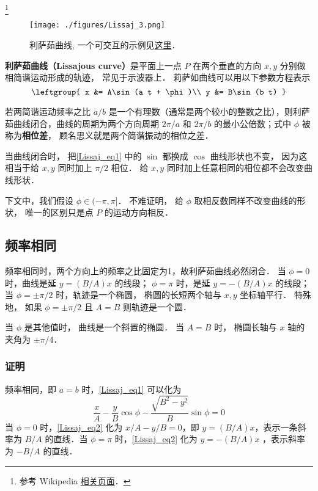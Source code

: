 

\footnote{参考 Wikipedia \href{https://en.wikipedia.org/wiki/Lissajous_curve}{相关页面}．}

\begin{figure}[ht]
\centering
\texttt{[image: ./figures/Lissaj\_3.png]}
\caption{利萨茹曲线, 一个可交互的示例见\href{https://www.geogebra.org/m/ubcdrmjb}{这里}．} \label{Lissaj_fig3}
\end{figure}

\textbf{利萨茹曲线（Lissajous curve）}是平面上一点 $P$ 在两个垂直的方向 $x, y$ 分别做相简谐运动形成的轨迹， 常见于示波器上． 莉萨如曲线可以用以下参数方程表示
\begin{equation}\label{Lissaj_eq1}
\leftgroup{
x &= A\sin(a t + \phi)\\
y &= B\sin(b t)
}\end{equation}

若两简谐运动频率之比 $a/b$ 是一个有理数（通常是两个较小的整数之比），则利萨茹曲线闭合，曲线的周期为两个方向周期 $2\pi/a$ 和 $2\pi/b$ 的最小公倍数；式中 $\phi$ 被称为\textbf{相位差}， 顾名思义就是两个简谐振动的相位之差．

当曲线闭合时， 把\autoref{Lissaj_eq1} 中的 $\sin$ 都换成 $\cos$ 曲线形状也不变， 因为这相当于给 $x, y$ 同时加上 $\pi/2$ 相位． 给 $x, y$ 同时加上任意相同的相位都不会改变曲线形状．

下文中，我们假设 $\phi \in (-\pi, \pi]$． 不难证明， 给 $\phi$ 取相反数同样不改变曲线的形状， 唯一的区别只是点 $P$ 的运动方向相反．

\subsection{频率相同}
频率相同时，两个方向上的频率之比固定为1，故利萨茹曲线必然闭合．
当 $\phi = 0$ 时，曲线是延 $y=(B/A)x$ 的线段； $\phi = \pi$ 时，是延 $y=-(B/A)x$ 的线段； 当 $\phi = \pm\pi/2$ 时，轨迹是一个椭圆， 椭圆的长短两个轴与 $x,y$ 坐标轴平行． 特殊地， 如果 $\phi = \pm\pi/2$ 且 $A = B$ 则轨迹是一个圆．

当 $\phi$ 是其他值时， 曲线是一个斜置的椭圆． 当 $A = B$ 时， 椭圆长轴与 $x$ 轴的夹角为 $\pm\pi/4$．
\subsubsection{证明}
频率相同，即 $a=b$ 时，\autoref{Lissaj_eq1} 可以化为
\begin{equation}\label{Lissaj_eq2}
\frac xA-\frac yB\cos\phi-\frac{\sqrt{B^2-y^2}}{B}\sin\phi=0
\end{equation}
当 $\phi=0$ 时，\autoref{Lissaj_eq2} 化为 $x/A-y/B=0$，即 $y=(B/A)x$，表示一条斜率为 $B/A$ 的直线．当 $\phi=\pi$ 时，\autoref{Lissaj_eq2} 化为 $y=-(B/A)x$ ，表示斜率为 $-B/A$ 的直线．

